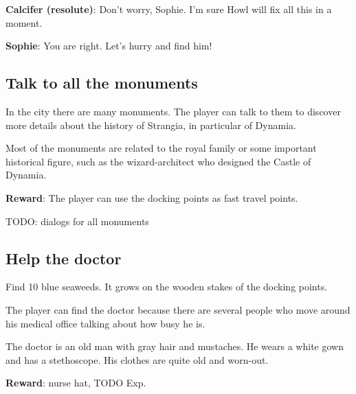 \textbf{Calcifer (resolute)}: Don't worry, Sophie. I'm sure Howl will fix all this in a moment.

\textbf{Sophie}: You are right. Let's hurry and find him!


\subsection{Talk to all the monuments}
In the city there are many monuments. The player can talk to them to discover more details about the history of Strangia, in particular of Dynamia.

Most of the monuments are related to the royal family or some important historical figure, such as the wizard-architect who designed the Castle of Dynamia.

\textbf{Reward}: The player can use the docking points as fast travel points.

TODO: dialogs for all monuments


\subsection{Help the doctor}
Find 10 blue seaweeds. It grows on the wooden stakes of the docking points.

The player can find the doctor because there are several people who move around his medical office talking about how busy he is.

The doctor is an old man with gray hair and mustaches. He wears a white gown and has a stethoscope. His clothes are quite old and worn-out.

\textbf{Reward}: nurse hat, TODO Exp.

